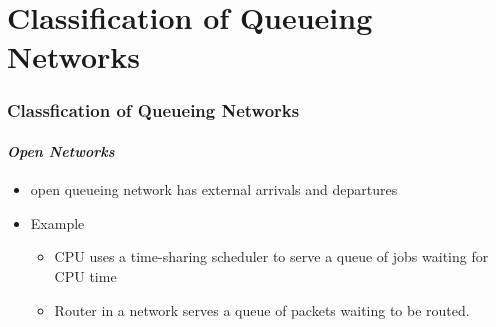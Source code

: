 \documentclass{beamer}
\begin{document}
\section{Classification of Queueing Networks}



\begin{frame}
    \frametitle{Classfication of Queueing Networks}
    \framesubtitle{\textbf{\textit{Open Networks}}}
	\begin{itemize}
		\item open queueing network has external arrivals and departures
		\item Example
			\begin{itemize}
			\item CPU uses a time-sharing scheduler to serve a queue of jobs waiting for CPU time
			\item Router in a network serves a queue of packets waiting to be routed.
			\end{itemize}
		  
	\end{itemize}	    
    
\end{frame}
\end{document}
